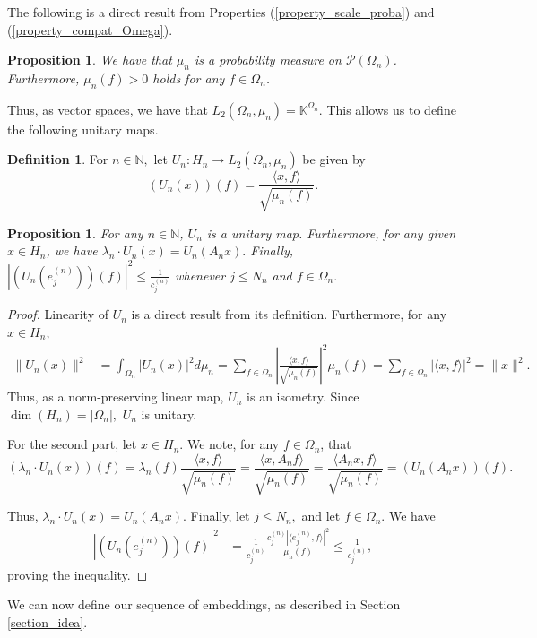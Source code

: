 \documentclass{amsart}
\newtheorem{prop}[thm]{Proposition}
\theoremstyle{definition}
\newtheorem{definition}[thm]{Definition}
\theoremstyle{remark}
\def \LL{\langle}
\def \RR{\rangle}
\begin{document}
The following is a direct result from Properties (\ref{property_scale_proba}) and (\ref{property_compat_Omega}).
\begin{prop}
	We have that $\mu_n$ is a probability measure on $\mathcal{P}(\Omega_n)$. Furthermore, $\mu_n(f)>0$ holds for any $f\in\Omega_n$.
\end{prop}

Thus, as vector spaces, we have that $L_2(\Omega_n,\mu_n)=\mathbb{K}^{\Omega_n}$. This allows us to define the following unitary maps.

\begin{definition}
	For $n\in\mathbb{N},$ let $U_n:H_n\rightarrow L_2(\Omega_n,\mu_n)$ be given by $$(U_n(x))(f)=\frac{\LL x, f\RR}{\sqrt{\mu_n(f)}}.$$
\end{definition}
\begin{prop}\label{proposition_finite_isometry}
	For any $n\in\mathbb{N}$, $U_n$ is a unitary map. Furthermore, for any given $x\in H_n$, we have $\lambda_n\cdot U_n(x)=U_n(A_nx).$ Finally, $|(U_n(e_j^{(n)}))(f)|^2\leq \frac{1}{c_j^{(n)}}$ whenever $j\leq N_n$ and $f\in\Omega_n.$
\end{prop}
\begin{proof}
	Linearity of $U_n$ is a direct result from its definition. Furthermore, for any $x\in H_n$, 
	\begin{align*}
		\|U_n(x)\|^2&=\int_{\Omega_n}|U_n(x)|^2d\mu_n=\sum_{f\in\Omega_n}\left|\frac{\LL x, f\RR}{\sqrt{\mu_n(f)}}\right|^2\mu_n(f)=\sum_{f\in\Omega_n}|\LL x,f\RR|^2=\|x\|^2.
	\end{align*}
	Thus, as a norm-preserving linear map, $U_n$ is an isometry. Since $\dim(H_n)=|\Omega_n|,$ $U_n$ is unitary.
	
	For the second part, let $x\in H_n.$ We note, for any $f\in\Omega_n$, that $$(\lambda_n\cdot U_n(x))(f)=\lambda_n(f)\frac{\LL x,f\RR}{\sqrt{\mu_n(f)}}=\frac{\LL x, A_n f\RR}{\sqrt{\mu_n(f)}}=\frac{\LL A_nx, f\RR}{\sqrt{\mu_n(f)}}=(U_n(A_nx))(f). $$
	
	Thus, $\lambda_n\cdot U_n(x)=U_n(A_nx).$ Finally, let $j\leq N_n,$ and let $f\in\Omega_n.$ We have
	\begin{align*}
		|(U_n(e_j^{(n)}))(f)|^2&=\frac{1}{c_j^{(n)}}\frac{c_j^{(n)}|\LL e_j^{(n)}, f\RR|^2}{\mu_n(f)}\leq \frac{1}{c_j^{(n)}},
	\end{align*}
	proving the inequality.
\end{proof}

We can now define our sequence of embeddings, as described in Section \ref{section_idea}.
\end{document}
